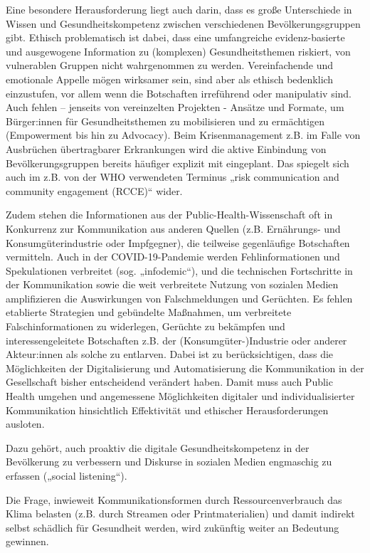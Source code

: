 \documentclass{article}
\begin{document}
Eine besondere Herausforderung liegt auch darin, dass es große Unterschiede in Wissen und Gesundheitskompetenz zwischen verschiedenen Bevölkerungsgruppen gibt. Ethisch problematisch ist dabei, dass eine umfangreiche evidenz-basierte und ausgewogene Information zu (komplexen) Gesundheitsthemen riskiert, von vulnerablen Gruppen nicht wahrgenommen zu werden. Vereinfachende und emotionale Appelle mögen wirksamer sein, sind aber als ethisch bedenklich einzustufen, vor allem wenn die Botschaften irreführend oder manipulativ sind. Auch fehlen – jenseits von vereinzelten Projekten - Ansätze und Formate, um Bürger:innen für Gesundheitsthemen zu mobilisieren und zu ermächtigen (Empowerment bis hin zu Advocacy). Beim Krisenmanagement z.B. im Falle von Ausbrüchen übertragbarer Erkrankungen wird die aktive Einbindung von Bevölkerungsgruppen bereits häufiger explizit mit eingeplant. Das spiegelt sich auch im z.B. von der WHO verwendeten Terminus „risk communication and community engagement (RCCE)“ wider. 


Zudem stehen die Informationen aus der Public-Health-Wissenschaft oft in Konkurrenz zur Kommunikation aus anderen Quellen (z.B. Ernährungs- und Konsumgüterindustrie oder Impfgegner), die teilweise gegenläufige Botschaften vermitteln. Auch in der COVID-19-Pandemie werden Fehlinformationen und Spekulationen verbreitet (sog. „infodemic“), und die technischen Fortschritte in der Kommunikation sowie die weit verbreitete Nutzung von sozialen Medien amplifizieren die Auswirkungen von Falschmeldungen und Gerüchten. Es fehlen etablierte Strategien und gebündelte Maßnahmen, um verbreitete Falschinformationen zu widerlegen, Gerüchte zu bekämpfen und interessengeleitete Botschaften z.B. der (Konsumgüter-)Industrie oder anderer Akteur:innen als solche zu entlarven. Dabei ist zu berücksichtigen, dass die Möglichkeiten der Digitalisierung und Automatisierung die Kommunikation in der Gesellschaft bisher entscheidend verändert haben. Damit muss auch Public Health umgehen und angemessene Möglichkeiten digitaler und individualisierter Kommunikation hinsichtlich Effektivität und ethischer Herausforderungen ausloten.


Dazu gehört, auch proaktiv die digitale Gesundheitskompetenz in der Bevölkerung zu verbessern und Diskurse in sozialen Medien engmaschig zu erfassen („social listening“).


Die Frage, inwieweit Kommunikationsformen durch Ressourcenverbrauch das Klima belasten (z.B. durch Streamen oder Printmaterialien) und damit indirekt selbst schädlich für Gesundheit werden, wird zukünftig weiter an Bedeutung gewinnen. 
\end{document}
